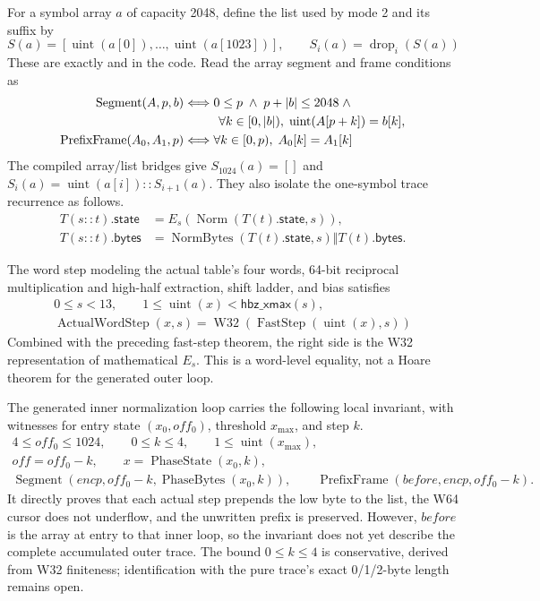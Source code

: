 For a symbol array \(a\) of capacity 2048, define the list used by mode 2 and
its suffix by
\[
  S(a)=[\operatorname{uint}(a[0]),\ldots,
        \operatorname{uint}(a[1023])],\qquad
  S_i(a)=\operatorname{drop}_i(S(a))
\]
These are exactly  and
 in the code. Read the array segment and frame conditions as
\[
\begin{aligned}
  \operatorname{Segment}(A,p,b)
    &\Longleftrightarrow
      0\le p\;\land\;p+|b|\le2048\;\land\\
    &\hspace{2.8em}\forall k\in[0,|b|),\;
      \operatorname{uint}(A[p+k])=b[k],\\
  \operatorname{PrefixFrame}(A_0,A_1,p)
    &\Longleftrightarrow
      \forall k\in[0,p),\;A_0[k]=A_1[k]
\end{aligned}
\]
The compiled array/list bridges give \(S_{1024}(a)=[]\) and
\(S_i(a)=\operatorname{uint}(a[i])::S_{i+1}(a)\). They also isolate the
one-symbol trace recurrence as follows.
\[
\begin{aligned}
  T(s::t).\mathsf{state}
    &=E_s(\operatorname{Norm}(T(t).\mathsf{state},s)),\\
  T(s::t).\mathsf{bytes}
    &=\operatorname{NormBytes}(T(t).\mathsf{state},s)
      \Vert T(t).\mathsf{bytes}.
\end{aligned}
\]

The word step modeling the actual table's four words, 64-bit reciprocal
multiplication and high-half extraction, shift ladder, and bias satisfies
\[
\begin{gathered}
  0\le s<13,\qquad
  1\le\operatorname{uint}(x)<\mathsf{hbz\_xmax}(s),\\
  \operatorname{ActualWordStep}(x,s)
   =\operatorname{W32}
      (\operatorname{FastStep}(\operatorname{uint}(x),s))
\end{gathered}
\]
Combined with the preceding fast-step theorem, the right side is the W32
representation of mathematical \(E_s\). This is a word-level equality, not a
Hoare theorem for the generated outer loop.

The generated  inner normalization loop carries the
following local invariant, with witnesses for entry state \((x_0,off_0)\),
threshold \(x_{\max}\), and step \(k\).
\[
\begin{gathered}
  4\le off_0\le1024,\qquad 0\le k\le4,\qquad
  1\le\operatorname{uint}(x_{\max}),\\
  off=off_0-k,\qquad
  x=\operatorname{PhaseState}(x_0,k),\\
  \operatorname{Segment}
    (encp,off_0-k,\operatorname{PhaseBytes}(x_0,k)),\qquad
  \operatorname{PrefixFrame}(before,encp,off_0-k).
\end{gathered}
\]
It directly proves that each actual  step prepends the low
byte to the list, the W64 cursor does not underflow, and the unwritten prefix
is preserved. However, \(before\) is the array at entry to that inner loop,
so the invariant does not yet describe the complete accumulated outer trace.
The bound \(0\le k\le4\) is conservative, derived from W32 finiteness;
identification with the pure trace's exact 0/1/2-byte length remains open.

